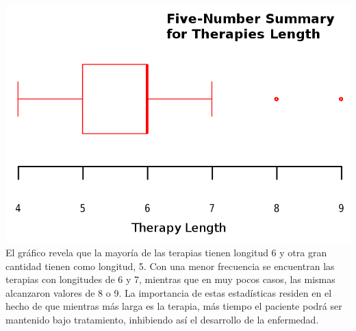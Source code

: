   \includegraphics[width=\linewidth]{images/therapy_length.png}
  El gr\'afico revela que la mayor\'ia de las terapias tienen longitud 6 y otra gran cantidad tienen como longitud, 5. Con una menor frecuencia se
  encuentran las terapias con longitudes de 6 y 7, mientras que en muy pocos casos, las mismas alcanzaron valores de 8 o 9. La importancia de estas 
  estad\'isticas residen en el hecho de que mientras m\'as larga es la terapia, m\'as tiempo el paciente podr\'a ser mantenido bajo tratamiento, inhibiendo 
  as\'i el desarrollo de la enfermedad.

